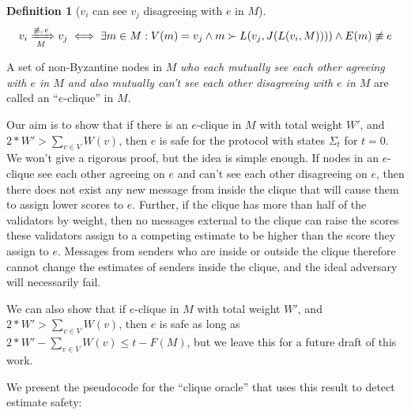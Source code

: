 \documentclass{article}
\theoremstyle{definition}
\newtheorem{defn}{Definition}[section]
\begin{document}
\begin{defn}[$v_i$ can see $v_j$ disagreeing with $e$ in $M$]
$$
v_i \xRightarrow[\text{$M$}]{\text{$\not\equiv, e$}} v_j \iff \exists m \in M : V(m) = v_j \land m \succ L(v_j, J(L(v_i, M)))) \land E(m) \not\equiv e
$$
\end{defn}

A set of non-Byzantine nodes in $M$ \emph{who each mutually see each other agreeing with $e$ in $M$ and also mutually can't see each other disagreeing with $e$ in $M$} are called an ``$e$-clique'' in $M$.

Our aim is to show that if there is an $e$-clique in $M$ with total weight $W'$, and $2*W' > \sum_{v\in V} W(v)$, then $e$ is safe for the protocol with states $\Sigma_t$ for $t = 0$. We won't give a rigorous proof, but the idea is simple enough. If nodes in an $e$-clique see each other agreeing on $e$ and can't see each other disagreeing on $e$, then there does not exist any new message from inside the clique that will cause them to assign lower scores to $e$. Further, if the clique has more than half of the validators by weight, then no messages external to the clique can raise the scores these validators assign to a competing estimate to be higher than the score they assign to $e$. Messages from senders who are inside or outside the clique therefore cannot change the estimates of senders inside the clique, and the ideal adversary will necessarily fail.

We can also show that if $e$-clique in $M$ with total weight $W'$, and $2*W' > \sum_{v\in V} W(v)$, then $e$ is safe as long as $2*W' - \sum_{v\in V} W(v) \leq t - F(M)$, but we leave this for a future draft of this work.

We present the pseudocode for the ``clique oracle'' that uses this result to detect estimate safety:
\end{document}
